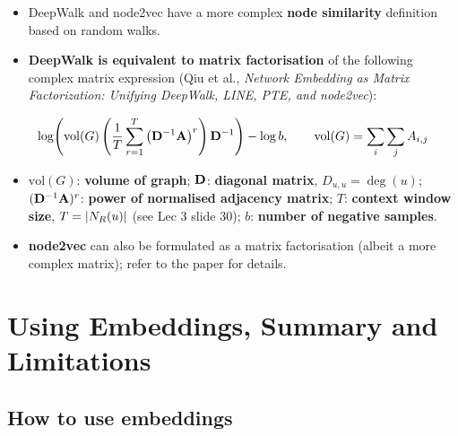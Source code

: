 \begin{itemize}
  \item DeepWalk and node2vec have a more complex \textbf{node similarity}
    definition based on random walks.
  \item \textbf{DeepWalk is equivalent to matrix factorisation} of the following
    complex matrix expression (Qiu et al., \emph{Network Embedding as Matrix
    Factorization: Unifying DeepWalk, LINE, PTE, and node2vec}):
\end{itemize}
\begin{equation}\label{eq:lec02-netmf}
  \log\!\left(\mathrm{vol}(G)\left(\frac{1}{T}\sum_{r=1}^{T}\big(\mathbf{D}^{-1}\mathbf{A}\big)^{r}\right)\mathbf{D}^{-1}\right)-\log b,
  \qquad
  \mathrm{vol}(G)=\sum_i\sum_jA_{i,j}
\end{equation}
\begin{itemize}
  \item $\mathrm{vol}(G)$: \textbf{volume of graph}; $\mathbf{D}$: \textbf{diagonal
    matrix}, $D_{u,u}=\deg(u)$; $(\mathbf{D}^{-1}\mathbf{A})^r$: \textbf{power of normalised
    adjacency matrix}; $T$: \textbf{context window size}, $T=|N_R(u)|$ (see Lec 3
    slide 30); $b$:
    \textbf{number of negative samples}.
  \item \textbf{node2vec} can also be formulated as a matrix factorisation
    (albeit a more complex matrix); refer to the paper for details.
\end{itemize}

\section{Using Embeddings, Summary and Limitations}\label{sec:lec02-use}

\subsection{How to use embeddings}\label{sec:lec02-howtouse}


